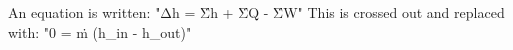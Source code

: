 An equation is written:  
"Δh = Σ̇h + Σ̇Q - Σ̇W"  
This is crossed out and replaced with:  
"0 = ṁ (h_in - h_out)"